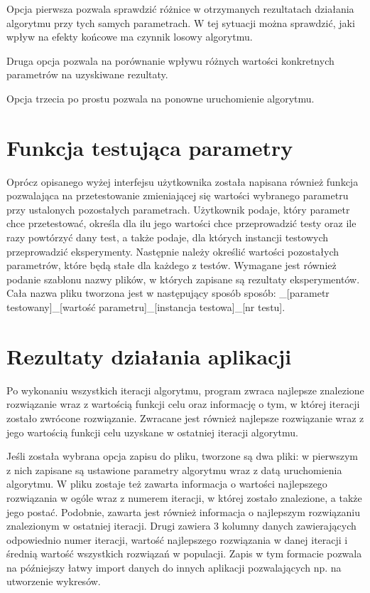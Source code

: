 Opcja pierwsza pozwala sprawdzić różnice w otrzymanych rezultatach działania algorytmu przy tych samych parametrach. W tej sytuacji można sprawdzić, jaki wpływ na efekty końcowe ma czynnik losowy algorytmu.

Druga opcja pozwala na porównanie wpływu różnych wartości konkretnych parametrów na uzyskiwane rezultaty.

Opcja trzecia po prostu pozwala na ponowne uruchomienie algorytmu.

\section{Funkcja testująca parametry}
Oprócz opisanego wyżej interfejsu użytkownika została napisana również funkcja pozwalająca na przetestowanie zmieniającej się wartości wybranego parametru przy ustalonych pozostałych parametrach. Użytkownik podaje, który parametr chce przetestować, określa dla ilu jego wartości chce przeprowadzić testy oraz ile razy powtórzyć dany test, a także podaje, dla których instancji testowych przeprowadzić eksperymenty. Następnie należy określić wartości pozostałych parametrów, które będą stałe dla każdego z testów. Wymagane jest również podanie szablonu nazwy plików, w których zapisane są rezultaty eksperymentów. Cała nazwa pliku tworzona jest w następujący sposób sposób:
\newline
[szablon]\_[parametr testowany]\_[wartość parametru]\_[instancja testowa]\_[nr testu].

\section{Rezultaty działania aplikacji}
Po wykonaniu wszystkich iteracji algorytmu, program zwraca najlepsze znalezione rozwiązanie wraz z wartością funkcji celu oraz informację o tym, w której iteracji zostało zwrócone rozwiązanie. Zwracane jest również najlepsze rozwiązanie wraz z jego wartością funkcji celu uzyskane w ostatniej iteracji algorytmu.

Jeśli została wybrana opcja zapisu do pliku, tworzone są dwa pliki: w pierwszym z nich zapisane są ustawione parametry algorytmu wraz z datą uruchomienia algorytmu. W pliku zostaje też zawarta informacja o wartości najlepszego rozwiązania w ogóle wraz z numerem iteracji, w której zostało znalezione, a także jego postać. Podobnie, zawarta jest również informacja o najlepszym rozwiązaniu znalezionym w ostatniej iteracji. Drugi zawiera 3 kolumny danych zawierających odpowiednio numer iteracji, wartość najlepszego rozwiązania w danej iteracji i średnią wartość wszystkich rozwiązań w populacji. Zapis w tym formacie pozwala na późniejszy łatwy import danych do innych aplikacji pozwalających np. na utworzenie wykresów.

